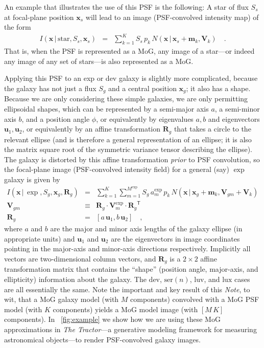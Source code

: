 \documentclass[12pt,pdftex,preprint]{aastex}
\newcommand{\documentname}{\textsl{Note}}
\newcommand{\project}[1]{\textsl{#1}}
\newcommand{\tmatrix}[1]{\boldsymbol{#1}}
\newcommand{\transpose}[1]{{#1}^{\mathsf T}}
\newcommand{\tvector}[1]{\boldsymbol{#1}}
\newcommand{\pos}{\tvector{x}}
\newcommand{\mean}{\tvector{m}}
\newcommand{\var}{\tmatrix{V}}
\newcommand{\affine}{\tmatrix{R}}
\newcommand{\uv}{\tvector{u}}
\newcommand{\normal}{N}
\newcommand{\given}{\,|\,}
\renewcommand{\star}{\mathrm{star}}
\newcommand{\dev}{\mathrm{dev}}
\newcommand{\ser}{\mathrm{ser}}
\newcommand{\lux}{\mathrm{lux}}
\newcommand{\luv}{\mathrm{luv}}
\begin{document}
An example that illustrates the use of this PSF is the following: A
star of flux $S_s$ at focal-plane position $\pos_s$ will lead to an
image (PSF-convolved intensity map) of the form
\begin{eqnarray}\displaystyle
I(\pos\given\star,S_s,\pos_s) &=& \sum_{k=1}^K S_s\,p_k\,\normal(\pos\given\pos_s+\mean_k,\var_k)
\quad .
\end{eqnarray}
That is, when the PSF is represented as a MoG, any image of a
star---or indeed any image of any set of stars---is also represented
as a MoG.

Applying this PSF to an exp or dev galaxy is slightly more
complicated, because the galaxy has not just a flux $S_g$ and a
central position $\pos_g$; it also has a shape.  Because we are only
considering these simple galaxies, we are only permitting ellipsoidal
shapes, which can be represented by a semi-major axis $a$, a
semi-minor axis $b$, and a position angle $\phi$, or equivalently by
eigenvalues $a, b$ and eigenvectors $\uv_1, \uv_2$, or equivalently by
an affine transformation $\affine_g$ that takes a circle to the
relevant ellipse (and is therefore a general representation of an
ellipse; it is also the matrix square root of the symmetric variance
tensor describing the ellipse).  The galaxy is distorted by this
affine transformation \emph{prior} to PSF convolution, so the
focal-plane image (PSF-convolved intensity field) for a general (say)
$\exp$ galaxy is given by
\begin{eqnarray}\displaystyle
I(\pos\given\exp,S_g,\pos_g,\affine_g) &=& \sum_{k=1}^K \sum_{m=1}^{M^{\exp}} S_g\,a^{\exp}_m\,p_k\,\normal(\pos\given\pos_g+\mean_k,\var_{gm}+\var_k)
\\
\var_{gm} &\equiv& \affine_g\cdot\var^{\exp}_m\cdot\transpose{\affine_g}
\\
\affine_g &=& \left[a\,\uv_1 , b\,\uv_2 \right]
\quad ,
\end{eqnarray}
where $a$ and $b$ are the major and minor axis lengths of the galaxy
ellipse (in appropriate units) and $\uv_1$ and $\uv_2$ are the
eigenvectors in image coordinates pointing in the major-axis and
minor-axis directions respectively.  Implicitly all vectors are
two-dimensional column vectors, and $\affine_g$ is a $2\times 2$
affine transformation matrix that contains the ``shape'' (position
angle, major-axis, and ellipticity) information about the galaxy.  The
$\dev$, $\ser(n)$, $\luv$, and $\lux$ cases are all essentially the
same.  Note the important and key result of this \documentname, to
wit, that a MoG galaxy model (with $M$ components) convolved with a
MoG PSF model (with $K$ components) yields a MoG model image (with
$[M\,K]$ components).  In \figurename~\ref{fig:example} we show how we
are using these MoG approximations in \project{The Tractor}---a
generative modeling framework for measuring astronomical objects---to
render PSF-convolved galaxy images.
\end{document}
